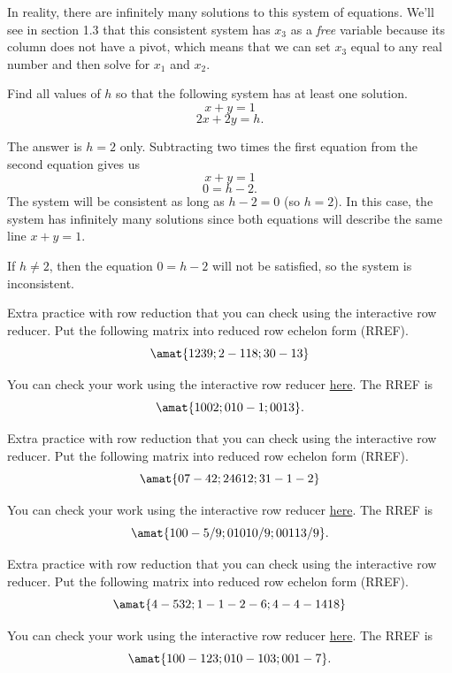 \begin{problems}
\begin{solution}
    In reality, there are infinitely many solutions to this system of
    equations.  We'll see in section 1.3 that this consistent system
    has $x_3$ as a \emph{free} variable because its column does not
    have a pivot, which means that we can set $x_3$ equal to any real
    number and then solve for $x_1$ and $x_2$.
  \end{solution}

  \problem Find all values of $h$ so that the following system has at least one solution. %
  \[x + y = 1\]
  \[2x + 2y = h.\]
  \begin{solution}
      The answer is $h=2$ only.  Subtracting two times the first equation from the second equation gives us
      \[x+y = 1\]
      \[0 = h - 2.\]
      The system will be consistent as long as $h-2 = 0$ (so $h=2$).  In this case, the system has infinitely many solutions since both equations will describe the same line $x+y = 1$. 
      
      If $h \neq 2$, then the equation $0= h-2$ will not be satisfied, so the system is inconsistent.
  \end{solution}

  \problem Extra practice with row reduction that you can check using the interactive row reducer.  Put the following matrix into reduced row echelon form (RREF). %
  \[\amat{1 2 3 9; 2 -1 1 8; 3 0 -1 3}\]
  \begin{solution}
      You can check your work using the interactive row reducer 
      {\color{blue} \href{https://textbooks.math.gatech.edu/ila/demos/rrinter.html?mat=1,2,3,9:2,-1,1,8:3,0,-1,3}{here}}.
      The RREF is
      \[\amat{1 0 0 2; 0 1 0 -1; 0 0 1 3}.\]
  \end{solution}

  \problem Extra practice with row reduction that you can check using the interactive row reducer.  Put the following matrix into reduced row echelon form (RREF). %
  \[\amat{0 7 -4 2; 2 4 6 12; 3 1 -1 -2}\]
  \begin{solution}
      You can check your work using the interactive row reducer 
      {\color{blue} \href{https://textbooks.math.gatech.edu/ila/demos/rrinter.html?mat=0,7,-4,2:2,4,6,12:3,1,-1,-2}{here}}.
      The RREF is
      \[\amat{1 0 0 -5/9; 0 1 0 10/9; 0 0 1 13/9}.\]
  \end{solution}

 \problem Extra practice with row reduction that you can check using the interactive row reducer.  Put the following matrix into reduced row echelon form (RREF). %
  \[\amat{4 -5 3 2; 1 -1 -2 -6; 4 -4 -14 18}\]
  \begin{solution}
      You can check your work using the interactive row reducer 
      {\color{blue} \href{https://textbooks.math.gatech.edu/ila/demos/rrinter.html?mat=4,-5,3,2:1,-1,-2,-6:4,-4,-14,18}{here}}.
      The RREF is
      \[\amat{1 0 0 -123; 0 1 0 -103; 0 0 1 -7}.\]
  \end{solution}
\end{problems} \setcounter{problem}{0}



